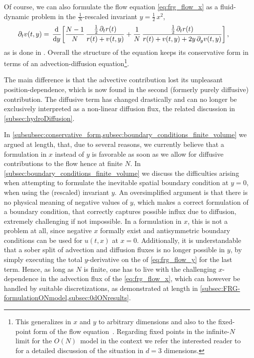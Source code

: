 Of course, we can also formulate the \frg{} flow equation \eqref{eq:frg_flow_x} as a fluid-dynamic problem in the $\tfrac{1}{N}$-rescaled invariant $y = \tfrac{1}{2} \, x^2$,
	\begin{align}
		\partial_t v ( t, y ) & = \, \dod{}{y}\! \bigg[ \frac{N - 1}{N} \, \frac{\tfrac{1}{2} \, \partial_t r ( t )}{r ( t ) + v ( t, y )} + \frac{1}{N} \, \frac{\tfrac{1}{2} \, \partial_t r ( t )}{r ( t ) + v(t,y) +2 y \, \partial_y v ( t, y )} \bigg] \, ,	\label{eq:frg_flow_y}
	\end{align}
as is done in .
Overall the structure of the equation keeps its conservative form in terms of an advection-diffusion equation\footnote{This generalizes in $x$ and $y$ to arbitrary dimensions and also to the fixed-point form of the \frg{} flow equation~\cite{Koenigstein:2021syz,Koenigstein:2021rxj,Stoll:2021ori}. 
Regarding fixed points in the infinite-$N$ limit for the $O(N)$~model in the \frg{} context we refer the interested reader to  for a detailed discussion of the situation in $d=3$ dimensions.}.

The main difference is that the advective contribution lost its unpleasant position-dependence, which is now found in the second (formerly purely diffusive) contribution. 
The diffusive term has changed drastically and can no longer be exclusively interpreted as a non-linear diffusion flux, \cf{} the related discussion in \cref{subsec:hydroDiffusion}. 

In \cref{subsubsec:conservative_form,subsec:boundary_conditions_finite_volume} we argued at length, that, due to several reasons, we currently believe that a formulation in $x$ instead of $y$ is favorable as soon as we allow for diffusive contributions to the \frg{} flow \dash{} hence at finite $N$. 
In \cref{subsec:boundary_conditions_finite_volume} we discuss the difficulties arising when attempting to formulate the inevitable spatial boundary condition at $y = 0$, when using the (rescaled) invariant $y$. 
An oversimplified argument is that there is no physical meaning of negative values of $y$, which makes a correct formulation of a boundary condition, that correctly captures possible influx due to diffusion, extremely challenging \dash{} if not impossible. 
In a formulation in $x$, this is not a problem at all, since negative $x$ formally exist and antisymmetric boundary conditions can be used for $u ( t, x )$ at $x = 0$. 
Additionally, it is understandable that a sober split of advection and diffusion fluxes is no longer possible in $y$, by simply executing the total $y$-derivative on the \rhs{} of \cref{eq:frg_flow_y} for the last term.
Hence, as long as $N$ is finite, one has to live with the challenging $x$-dependence in the advection flux of the \pde{} \eqref{eq:frg_flow_x}, which can however be handled by suitable discretizations, as demonstrated at length in \cref{subsec:FRG-formulationONmodel,subsec:0dONresults}.

